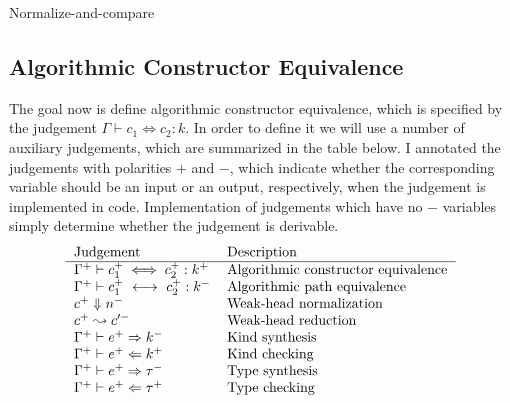 \documentclass{amsart}
\begin{document}
\begin{section}{Normalize-and-compare}
    \section{Algorithmic Constructor Equivalence}
    The goal now is define algorithmic constructor equivalence, which is specified by the judgement $\Gamma \vdash c_1 \iff c_2 : k$. In order to define it we will use a number of auxiliary judgements, which are summarized in the table below. I annotated the judgements with polarities $+$ and $-$, which indicate whether the corresponding variable should be an input or an output, respectively, when the judgement is implemented in code. Implementation of judgements which have no $-$ variables simply determine whether the judgement is derivable.
        \newcommand{\patheq}{\ \longleftrightarrow\ }
        \newcommand{\whnorm}{\Downarrow}
        \newcommand{\whred}{\leadsto}
        \newcommand{\synth}{\Rightarrow}
        \renewcommand{\check}{\Leftarrow}
        \[
            \begin{tabular}{l l}
                Judgement & Description \\
                \hline
                $\Gamma^+ \vdash c_1^+ \iff c_2^+ : k^+$ & Algorithmic constructor equivalence \\
                $\Gamma^+ \vdash c_1^+ \patheq c_2^+ : k^-$ & Algorithmic path equivalence \\
                $c^+ \whnorm n^-$ & Weak-head normalization \\
                $c^+ \whred c'^-$ & Weak-head reduction \\
                $\Gamma^+ \vdash e^+ \synth k^-$ & Kind synthesis \\
                $\Gamma^+ \vdash e^+ \check k^+$ & Kind checking \\
                $\Gamma^+ \vdash e^+ \synth \tau^-$ & Type synthesis \\
                $\Gamma^+ \vdash e^+ \check \tau^+$ & Type checking
            \end{tabular}
        \]
\end{section}
    
\end{document}
